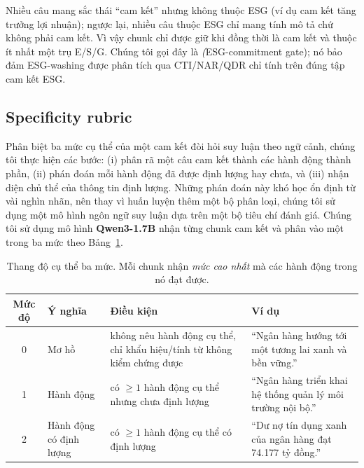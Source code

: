 \documentclass[runningheads]{llncs}
\begin{document}
Nhiều câu mang sắc thái ``cam kết'' nhưng không thuộc ESG (ví dụ cam kết tăng trưởng lợi nhuận); ngược lại, nhiều câu thuộc ESG chỉ mang tính mô tả chứ không phải cam kết. Vì vậy chunk chỉ được giữ khi đồng thời là cam kết và thuộc ít nhất một trụ E/S/G. Chúng tôi gọi đây là \emph(ESG-commitment gate); nó bảo đảm ESG-washing được phân tích qua CTI/NAR/QDR chỉ tính trên đúng tập cam kết ESG.

\subsection{Specificity rubric}
Phân biệt ba mức cụ thể của một cam kết đòi hỏi suy luận theo ngữ cảnh, chúng tôi thực hiện các bước: (i) phân rã một câu cam kết thành các hành động thành phần, (ii) phán đoán mỗi hành động đã được định lượng hay chưa, và (iii) nhận diện chủ thể của thông tin định lượng. Những phán đoán này khó học ổn định từ vài nghìn nhãn, nên thay vì huấn luyện thêm một bộ phân loại, chúng tôi sử dụng một mô hình ngôn ngữ suy luận dựa trên một bộ tiêu chí đánh giá. Chúng tôi sử dụng mô hình \textbf{Qwen3-1.7B} nhận từng chunk cam kết và phân vào một trong ba mức theo Bảng~\ref{tab:rubric}.

\begin{table}[H]
\centering
\caption{Thang độ cụ thể ba mức. Mỗi chunk nhận \emph{mức cao nhất} mà các hành động trong nó đạt được.}
\label{tab:rubric}
\begin{tabular}{
    c
    >{\raggedright\arraybackslash}p{2.2cm}
    p{4cm}
    p{3.6cm}
}
\toprule
Mức độ & Ý nghĩa & Điều kiện & Ví dụ \\
\midrule

0 & Mơ hồ & không nêu hành động cụ thể, chỉ khẩu hiệu/tính từ không kiểm chứng được & ``Ngân hàng hướng tới một tương lai xanh và bền vững.'' \\
1 & Hành động & có $\ge 1$ hành động cụ thể nhưng chưa định lượng & ``Ngân hàng triển khai hệ thống quản lý môi trường nội bộ.'' \\
2 & Hành động có định lượng & có $\ge 1$ hành động cụ thể có định lượng & ``Dư nợ tín dụng xanh của ngân hàng đạt 74.177 tỷ đồng.'' \\
\bottomrule
\end{tabular}
\end{table}
\end{document}

